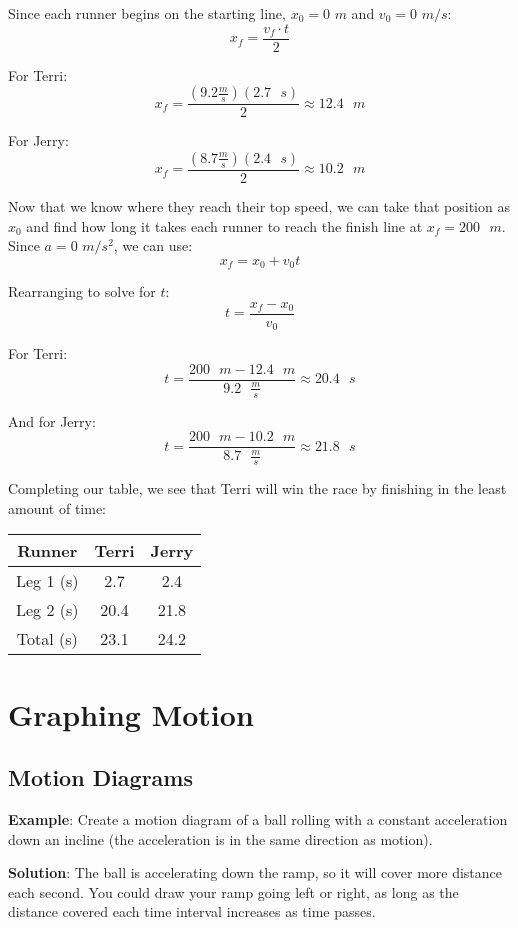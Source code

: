 Since each runner begins on the starting line, $x_0 = 0$ $m$ and $v_0 = 0$ $m/s$:
$$x_f = \frac{v_f \cdot t}{2}$$

For Terri:
$$x_f = \frac{\left(9.2 \frac{m}{s} \right) \left(2.7\text{ }s \right)}{2} 
\approx 12.4 \text{ }m$$

For Jerry:
$$x_f = \frac{\left( 8.7 \frac{m}{s} \right) \left( 2.4 \text{ }s \right)}{2} 
\approx 10.2 \text{ }m$$

Now that we know where they reach their top speed, we can take that position as 
$x_0$ and find how long it takes each runner to reach the finish line at $x_f = 
200\text{ }m$. Since $a = 0$ $m/s^2$, we can use:
$$x_f = x_0 + v_0 t$$

Rearranging to solve for $t$:
$$t = \frac{x_f - x_0}{v_0}$$

For Terri:
$$t = \frac{200 \text{ } m - 12.4 \text{ } m}{9.2 \text{ } \frac{m}{s}} \approx 
20.4\text{ }s$$

And for Jerry:
$$t = \frac{200 \text{ } m - 10.2 \text{ } m}{8.7 \text{ } \frac{m}{s}} \approx 
21.8 \text{ } s$$

Completing our table, we see that Terri will win the race by finishing in the 
least amount of time:
\begin{center}
\begin{tabular}{|c|c|c|}
\hline
Runner & Terri & Jerry\\\hline
Leg 1 (s) & 2.7 & 2.4 \\\hline
Leg 2 (s) & 20.4 & 21.8 \\\hline
Total (s) & 23.1 & 24.2 \\\hline
\end{tabular}
\end{center}

\section{Graphing Motion}

\subsection{Motion Diagrams}

\textbf{Example}: Create a motion diagram of a ball rolling with a constant 
acceleration down an incline (the acceleration is in the same direction as 
motion). 

\textbf{Solution}: The ball is accelerating down the ramp, so it will cover 
more distance each second. You could draw your ramp going left or right, as 
long as the distance covered each time interval increases as time passes. 

